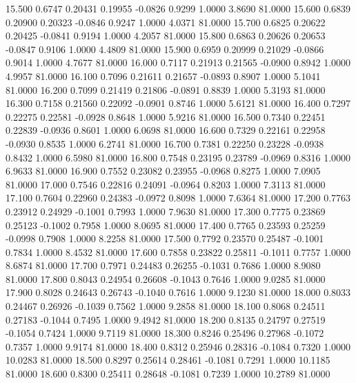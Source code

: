   15.500   0.6747   0.20431   0.19955  -0.0826   0.9299   1.0000   3.8690  81.0000
  15.600   0.6839   0.20900   0.20323  -0.0846   0.9247   1.0000   4.0371  81.0000
  15.700   0.6825   0.20622   0.20425  -0.0841   0.9194   1.0000   4.2057  81.0000
  15.800   0.6863   0.20626   0.20653  -0.0847   0.9106   1.0000   4.4809  81.0000
  15.900   0.6959   0.20999   0.21029  -0.0866   0.9014   1.0000   4.7677  81.0000
  16.000   0.7117   0.21913   0.21565  -0.0900   0.8942   1.0000   4.9957  81.0000
  16.100   0.7096   0.21611   0.21657  -0.0893   0.8907   1.0000   5.1041  81.0000
  16.200   0.7099   0.21419   0.21806  -0.0891   0.8839   1.0000   5.3193  81.0000
  16.300   0.7158   0.21560   0.22092  -0.0901   0.8746   1.0000   5.6121  81.0000
  16.400   0.7297   0.22275   0.22581  -0.0928   0.8648   1.0000   5.9216  81.0000
  16.500   0.7340   0.22451   0.22839  -0.0936   0.8601   1.0000   6.0698  81.0000
  16.600   0.7329   0.22161   0.22958  -0.0930   0.8535   1.0000   6.2741  81.0000
  16.700   0.7381   0.22250   0.23228  -0.0938   0.8432   1.0000   6.5980  81.0000
  16.800   0.7548   0.23195   0.23789  -0.0969   0.8316   1.0000   6.9633  81.0000
  16.900   0.7552   0.23082   0.23955  -0.0968   0.8275   1.0000   7.0905  81.0000
  17.000   0.7546   0.22816   0.24091  -0.0964   0.8203   1.0000   7.3113  81.0000
  17.100   0.7604   0.22960   0.24383  -0.0972   0.8098   1.0000   7.6364  81.0000
  17.200   0.7763   0.23912   0.24929  -0.1001   0.7993   1.0000   7.9630  81.0000
  17.300   0.7775   0.23869   0.25123  -0.1002   0.7958   1.0000   8.0695  81.0000
  17.400   0.7765   0.23593   0.25259  -0.0998   0.7908   1.0000   8.2258  81.0000
  17.500   0.7792   0.23570   0.25487  -0.1001   0.7834   1.0000   8.4532  81.0000
  17.600   0.7858   0.23822   0.25811  -0.1011   0.7757   1.0000   8.6874  81.0000
  17.700   0.7971   0.24483   0.26255  -0.1031   0.7686   1.0000   8.9080  81.0000
  17.800   0.8043   0.24954   0.26608  -0.1043   0.7646   1.0000   9.0285  81.0000
  17.900   0.8028   0.24643   0.26743  -0.1040   0.7616   1.0000   9.1230  81.0000
  18.000   0.8033   0.24467   0.26926  -0.1039   0.7562   1.0000   9.2858  81.0000
  18.100   0.8068   0.24511   0.27183  -0.1044   0.7495   1.0000   9.4942  81.0000
  18.200   0.8135   0.24797   0.27519  -0.1054   0.7424   1.0000   9.7119  81.0000
  18.300   0.8246   0.25496   0.27968  -0.1072   0.7357   1.0000   9.9174  81.0000
  18.400   0.8312   0.25946   0.28316  -0.1084   0.7320   1.0000  10.0283  81.0000
  18.500   0.8297   0.25614   0.28461  -0.1081   0.7291   1.0000  10.1185  81.0000
  18.600   0.8300   0.25411   0.28648  -0.1081   0.7239   1.0000  10.2789  81.0000
